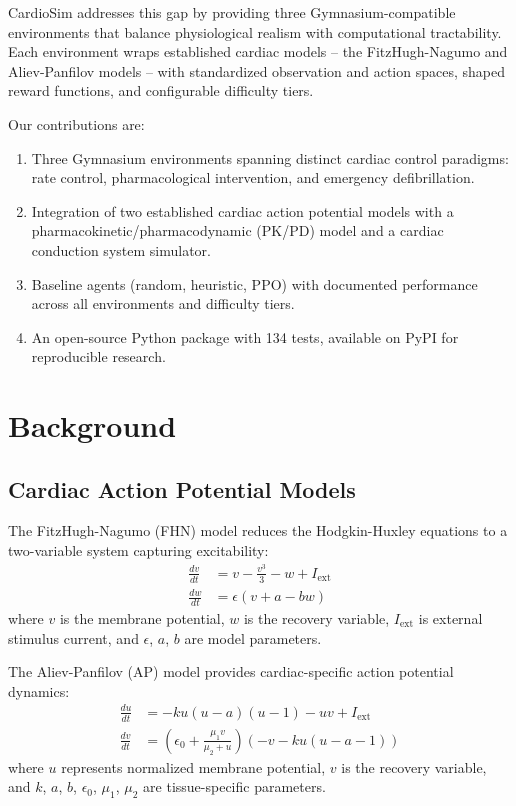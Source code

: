 \documentclass[11pt,a4paper]{article}
\begin{document}
CardioSim addresses this gap by providing three Gymnasium-compatible \citep{towers2024gymnasium} environments that balance physiological realism with computational tractability. Each environment wraps established cardiac models -- the FitzHugh-Nagumo \citep{fitzhugh1961impulses, nagumo1962active} and Aliev-Panfilov \citep{aliev1996simple} models -- with standardized observation and action spaces, shaped reward functions, and configurable difficulty tiers.

Our contributions are:
\begin{enumerate}
    \item Three Gymnasium environments spanning distinct cardiac control paradigms: rate control, pharmacological intervention, and emergency defibrillation.
    \item Integration of two established cardiac action potential models with a pharmacokinetic/pharmacodynamic (PK/PD) model and a cardiac conduction system simulator.
    \item Baseline agents (random, heuristic, PPO) with documented performance across all environments and difficulty tiers.
    \item An open-source Python package with 134 tests, available on PyPI for reproducible research.
\end{enumerate}

\section{Background}

\subsection{Cardiac Action Potential Models}

The FitzHugh-Nagumo (FHN) model \citep{fitzhugh1961impulses} reduces the Hodgkin-Huxley equations \citep{hodgkin1952quantitative} to a two-variable system capturing excitability:
\begin{align}
    \frac{dv}{dt} &= v - \frac{v^3}{3} - w + I_{\text{ext}} \\
    \frac{dw}{dt} &= \epsilon(v + a - bw)
\end{align}
where $v$ is the membrane potential, $w$ is the recovery variable, $I_{\text{ext}}$ is external stimulus current, and $\epsilon$, $a$, $b$ are model parameters.

The Aliev-Panfilov (AP) model \citep{aliev1996simple} provides cardiac-specific action potential dynamics:
\begin{align}
    \frac{du}{dt} &= -ku(u - a)(u - 1) - uv + I_{\text{ext}} \\
    \frac{dv}{dt} &= \left(\epsilon_0 + \frac{\mu_1 v}{\mu_2 + u}\right)(-v - ku(u - a - 1))
\end{align}
where $u$ represents normalized membrane potential, $v$ is the recovery variable, and $k$, $a$, $b$, $\epsilon_0$, $\mu_1$, $\mu_2$ are tissue-specific parameters.
\end{document}
